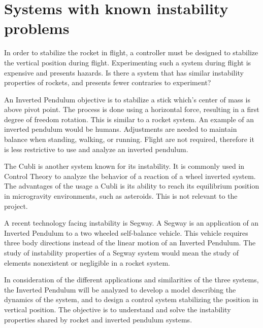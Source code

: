 \section{Systems with known instability problems}

In order to stabilize the rocket in flight, a controller must be designed to stabilize the vertical position during flight. Experimenting such a system during flight is expensive and presents hazards.
Is there a system that has similar instability properties of rockets, and presents fewer contraries to experiment?

An Inverted Pendulum objective is to stabilize a stick which’s center of mass is above pivot point. The process is done using a horizontal force, resulting in a first degree of freedom rotation. This is similar to a rocket system. An example of an inverted pendulum would be humans. Adjustments are needed to maintain balance when standing, walking, or running. Flight are not required, therefore it is less restrictive to use and analyze an inverted pendulum.

The Cubli is another system known for its instability. It is commonly used in Control Theory to analyze the behavior of a reaction of a wheel inverted system. The advantages of the usage a Cubli is its ability to reach its equilibrium position in microgravity environments, such as asteroids. This is not relevant to the project.

A recent technology facing instability is Segway. A Segway is an application of an Inverted Pendulum to a two wheeled self-balance vehicle. This vehicle requires three body directions instead of the linear motion of an Inverted Pendulum. The study of instability properties of a Segway system would mean the study of elements nonexistent or negligible in a rocket system.

In consideration of the different applications and similarities of the three systems, the Inverted Pendulum will be analyzed to develop a model describing the dynamics of the system, and to design a control system stabilizing the position in vertical position. The objective is to understand and solve the instability properties shared by rocket and inverted pendulum systems.



